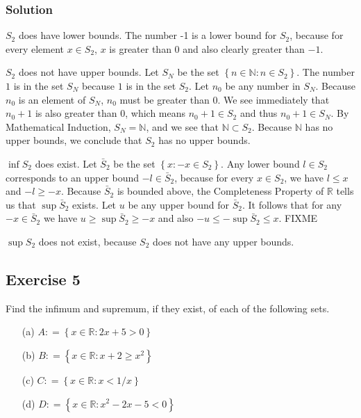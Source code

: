 \documentclass[12pt]{article}
\begin{document}
\subsubsection*{Solution}
$S_2$ does have lower bounds. The number -1 is a lower bound for $S_2$, because for every element $x \in S_2$, $x$ is greater than $0$ and also clearly greater than $-1$.

$S_2$ does not have upper bounds. Let $S_N$ be the set $\left\{n \in \mathbb{N} : n \in S_2\right\}$. The number $1$ is in the set $S_N$ because $1$ is in the set $S_2$. Let $n_0$ be any number in $S_N$. Because $n_0$ is an element of $S_N$, $n_0$ must be greater than $0$. We see immediately that $n_0 + 1$ is also greater than $0$, which means $n_0 + 1 \in S_2$ and thus $n_0 + 1 \in S_N$. By Mathematical Induction, $S_N = \mathbb{N}$, and we see that $\mathbb{N} \subset S_2$. Because $\mathbb{N}$ has no upper bounds, we conclude that $S_2$ has no upper bounds.

$\inf S_2$ does exist. Let $\bar{S}_2$ be the set $\left\{x : -x \in S_2\right\}$. Any lower bound $l \in S_2$ corresponds to an upper bound $-l \in \bar{S}_2$, because for every $x \in S_2$, we have $l \leq x$ and $-l \geq -x$. Because $\bar{S}_2$ is bounded above, the Completeness Property of $\mathbb{R}$ tells us that $\sup \bar{S}_2$ exists. Let $u$ be any upper bound for $\bar{S}_2$. It follows that for any $-x \in \bar{S}_2$ we have $u \geq \sup \bar{S}_2 \geq -x$ and also $-u \leq -\sup\bar{S}_2 \leq x$. FIXME

$\sup S_2$ does not exist, because $S_2$ does not have any upper bounds.

\subsection*{Exercise 5}
Find the infimum and supremum, if they exist, of each of the following sets.
\begin{itemize}
\item[(a)] $A \mathrel{\mathop:}= \left\{x \in \mathbb{R} : 2x + 5 > 0\right\}$
\item[(b)] $B \mathrel{\mathop:}= \left\{x \in \mathbb{R} : x + 2 \geq x^2\right\}$
\item[(c)] $C \mathrel{\mathop:}= \left\{x \in \mathbb{R} : x < 1/x\right\}$
\item[(d)] $D \mathrel{\mathop:}= \left\{x \in \mathbb{R} : x^2 - 2x - 5 < 0\right\}$
\end{itemize}
\end{document}
